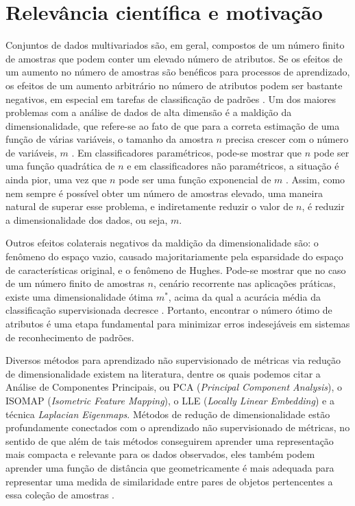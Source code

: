 \documentclass[a4paper,12pt]{article}
\begin{document}
\section{Relevância científica e motivação}
\label{sc:motivacao}
\noindent
Conjuntos de dados multivariados são, em geral, compostos de um número finito de amostras que podem conter um elevado número de atributos. Se os efeitos de um aumento no número de amostras são benéficos para processos de aprendizado, os efeitos de um aumento arbitrário no número de atributos podem ser bastante negativos, em especial em tarefas de classificação de padrões \cite{Debie}. Um dos maiores problemas com a análise de dados de alta dimensão é a maldição da dimensionalidade, que refere-se ao fato de que para a correta estimação de uma função de várias variáveis, o tamanho da amostra $n$ precisa crescer com o número de variáveis, $m$ \cite{Bellman:61}. Em classificadores paramétricos, pode-se mostrar que $n$ pode ser uma função quadrática de $n$ e em classificadores não paramétricos, a situação é ainda pior, uma vez que $n$ pode ser uma função exponencial de $m$ \cite{Fukunaga,Scott92,Hwang94}. Assim, como nem sempre é possível obter um número de amostras elevado, uma maneira natural de superar esse problema, e indiretamente reduzir o valor de $n$, é reduzir a dimensionalidade dos dados, ou seja, $m$.

Outros efeitos colaterais negativos da maldição da dimensionalidade são: o fenômeno do espaço vazio, causado majoritariamente pela esparsidade do espaço de características original, e o fenômeno de Hughes. Pode-se mostrar que no caso de um número finito de amostras $n$, cenário recorrente nas aplicações práticas, existe uma dimensionalidade ótima $m^{*}$, acima da qual a acurácia média da classificação supervisionada decresce \cite{Hughes68}. Portanto, encontrar o número ótimo de atributos é uma etapa fundamental para minimizar erros indesejáveis em sistemas de reconhecimento de padrões.

Diversos métodos para aprendizado não supervisionado de métricas via redução de dimensionalidade existem na literatura, dentre os quais podemos citar a Análise de Componentes Principais, ou PCA (\emph{Principal Component Analysis}), o ISOMAP (\emph{Isometric Feature Mapping}), o LLE (\emph{Locally Linear Embedding}) e a técnica \emph{Laplacian Eigenmaps}. Métodos de redução de dimensionalidade estão profundamente conectados com o aprendizado não supervisionado de métricas, no sentido de que além de tais métodos conseguirem aprender uma representação mais compacta e relevante para os dados observados, eles também podem aprender uma função de distância que geometricamente é mais adequada para representar uma medida de similaridade entre pares de objetos pertencentes a essa coleção de amostras \cite{MetricLearning1,MetricLearning2}.
\end{document}
